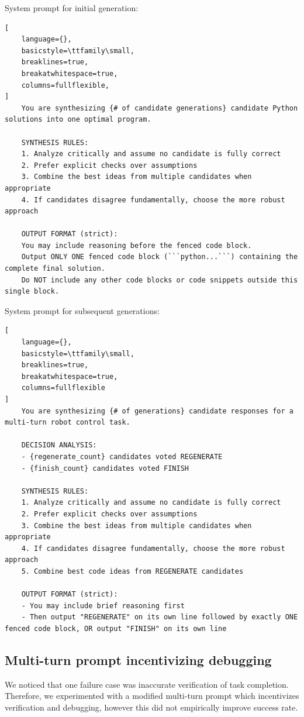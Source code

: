 System prompt for initial generation:
\begin{lstlisting}[
    language={},
    basicstyle=\ttfamily\small,
    breaklines=true,
    breakatwhitespace=true,
    columns=fullflexible,
]
    You are synthesizing {# of candidate generations} candidate Python solutions into one optimal program.
    
    SYNTHESIS RULES:
    1. Analyze critically and assume no candidate is fully correct
    2. Prefer explicit checks over assumptions
    3. Combine the best ideas from multiple candidates when appropriate
    4. If candidates disagree fundamentally, choose the more robust approach

    OUTPUT FORMAT (strict):
    You may include reasoning before the fenced code block.
    Output ONLY ONE fenced code block (```python...```) containing the complete final solution.
    Do NOT include any other code blocks or code snippets outside this single block.
\end{lstlisting}

System prompt for subsequent generations:
\begin{lstlisting}[
    language={},
    basicstyle=\ttfamily\small,
    breaklines=true,
    breakatwhitespace=true,
    columns=fullflexible
]
    You are synthesizing {# of generations} candidate responses for a multi-turn robot control task.

    DECISION ANALYSIS:
    - {regenerate_count} candidates voted REGENERATE
    - {finish_count} candidates voted FINISH

    SYNTHESIS RULES:
    1. Analyze critically and assume no candidate is fully correct
    2. Prefer explicit checks over assumptions
    3. Combine the best ideas from multiple candidates when appropriate
    4. If candidates disagree fundamentally, choose the more robust approach
    5. Combine best code ideas from REGENERATE candidates

    OUTPUT FORMAT (strict):
    - You may include brief reasoning first
    - Then output "REGENERATE" on its own line followed by exactly ONE fenced code block, OR output "FINISH" on its own line
\end{lstlisting}



\subsection{Multi-turn prompt incentivizing debugging}
We noticed that one failure case was inaccurate verification of task completion. Therefore, we experimented with a modified multi-turn prompt which incentivizes verification and debugging, however this did not empirically improve success rate.

